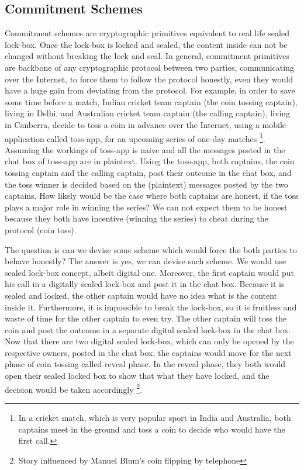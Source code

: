 {     \subsection{Commitment Schemes}   
     \label{sec:commscheme}
      Commitment schemes are cryptographic primitives equivalent to real life sealed lock-box.
      Once the lock-box is locked and sealed, the content inside  can not be changed without breaking the lock and seal. 
      In general, commitment primitives 
      are backbone of any cryptographic protocol between two parties, communicating over the Internet, to force them  to  follow the 
      protocol honestly, even they would have a huge gain from deviating 
      from the protocol. For example, in order to save some time before a match, Indian cricket team captain (the coin tossing captain), living in Delhi, and Australian cricket 
      team captain (the calling captain), living in Canberra, decide 
      to toss a coin in advance over the Internet, using a mobile application  called toss-app, for an  upcoming series of one-day matches
      \footnote{
      In a cricket match, which is very popular sport in India and Australia, both captains meet in the ground and toss a coin to 
      decide who would have the first call.}.  Assuming the workings of toss-app is naive and all the messages posted in 
      the chat box of toss-app are in plaintext.   Using the toss-app,  both captains, the coin tossing captain and the calling captain,  post their 
      outcome in the chat box,  and the toss winner is decided based on the (plaintext) messages posted by the two captains.  
	 How likely would be the case where both captains are honest, if the toss plays a major role in winning the series? 
	 We can not expect them to be honest because they both have incentive (winning the series) to cheat during the 
	 protocol (coin toss).      
      
      The question is can we devise some scheme which would force the both parties to behave honestly? 
      The answer is yes, we can devise such scheme.  We would use sealed lock-box concept, albeit digital one. Moreover, 
      the first captain would put his call in a digitally sealed lock-box and post it in the chat box. Because it is sealed and 
      locked, the other captain would have no idea what is the content inside it. Furthermore, it is impossible to break 
      the lock-box, so it is fruitless and waste of time for the other captain to even try. The other captain will toss the coin 
      and post the outcome in a separate digital sealed lock-box  in the chat box.  Now that there are two digital sealed lock-box, which can 
      only be opened by the respective owners,  posted in the chat box,  the captains would move for the next phase of coin tossing  called reveal phase. 
      In the reveal phase, they both would open their sealed locked box to show that what they have locked, 
      and the decision would be taken accordingly \footnote{Story influenced by Manuel Blum's coin flipping by telephone}. 
      
}
